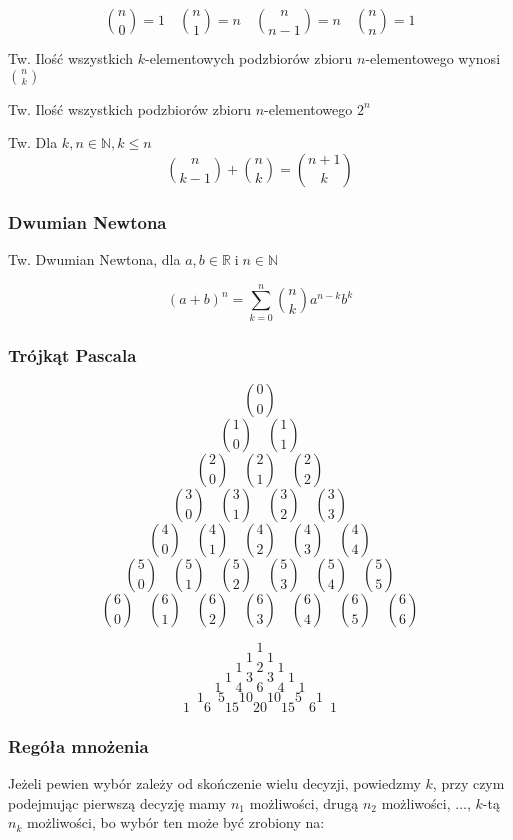 \documentclass[../Matematyka.tex]{subfiles}
\begin{document}
\begin{displaymath}
    \binom{n}{0} = 1 \quad
    \binom{n}{1} = n \quad
    \binom{n}{n - 1} = n \quad
    \binom{n}{n} = 1
\end{displaymath}

Tw. Ilość wszystkich \(k\)-elementowych podzbiorów zbioru \(n\)-elementowego wynosi \(\binom{n}{k}\)\par
Tw. Ilość wszystkich podzbiorów zbioru \(n\)-elementowego \(2^n\)\par
Tw. Dla \(k, n \in \mathbb{N}, k \leq n\)
\begin{displaymath}
    \binom{n}{k-1}+
    \binom{n}{k} =
    \binom{n+1}{k}
\end{displaymath}

\subsubsection*{Dwumian Newtona}
Tw. Dwumian Newtona, dla  \(a, b \in \mathbb{R} \;\text{i}\; n \in \mathbb{N}\)

\[(a+b)^n = \sum^{n}_{k=0} \binom{n}{k}a^{n-k}b^k\]

\subsubsection*{Trójkąt Pascala}

\[\binom{0}{0}\]
\[\binom{1}{0}\quad\binom{1}{1}\]
\[\binom{2}{0}\quad\binom{2}{1}\quad\binom{2}{2}\]
\[\binom{3}{0}\quad\binom{3}{1}\quad\binom{3}{2}\quad\binom{3}{3}\]
\[\binom{4}{0}\quad\binom{4}{1}\quad\binom{4}{2}\quad\binom{4}{3}\quad\binom{4}{4}\]
\[\binom{5}{0}\quad\binom{5}{1}\quad\binom{5}{2}\quad\binom{5}{3}\quad\binom{5}{4}\quad\binom{5}{5}\]
\[\binom{6}{0}\quad\binom{6}{1}\quad\binom{6}{2}\quad\binom{6}{3}\quad\binom{6}{4}\quad\binom{6}{5}\quad\binom{6}{6}\]

\[1\]
\[1\quad1\]
\[1\quad2\quad1\]
\[1\quad3\quad3\quad1\]
\[1\quad4\quad6\quad4\quad1\]
\[1\quad5\quad10\quad10\quad5\quad1\]
\[1\quad6\quad15\quad20\quad15\quad6\quad1\]

\subsubsection{Regóła mnożenia}
Jeżeli pewien wybór zależy od skończenie wielu decyzji, powiedzmy \(k\),
przy czym podejmując pierwszą decyzję mamy \(n_1\) możliwości, drugą \(n_2\) możliwości,
\(\ldots\), \(k\)-tą \(n_k\) możliwości, bo wybór ten może być zrobiony na:
\end{document}
